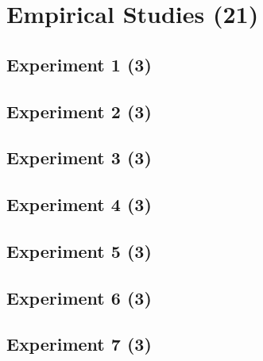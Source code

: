 
\chapter{Empirical Studies (21) }
\label{ch:empirical}

\section{Experiment 1 (3)}
\label{sec:expmeriment1}

\section{Experiment 2 (3)}
\label{sec:experiment2}

\section{Experiment 3 (3)}
\label{sec:experiment3}

\section{Experiment 4 (3)}
\label{sec:experiment4}

\section{Experiment 5 (3)}
\label{sec:experiment5}

\section{Experiment 6 (3)}
\label{sec:experiment6}

\section{Experiment 7 (3)}
\label{sec:experiment7}
